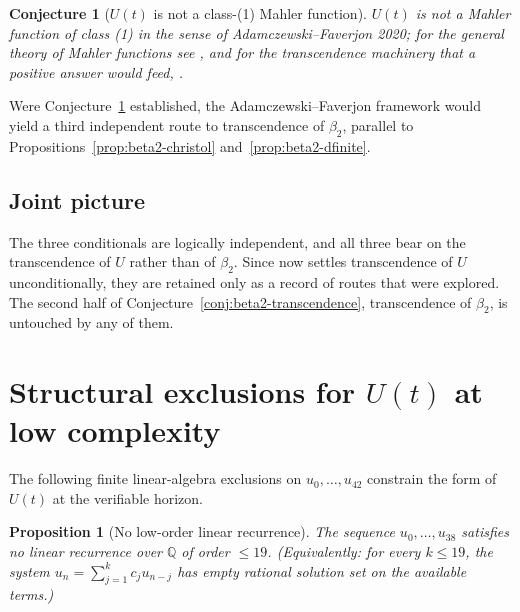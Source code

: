 \documentclass[11pt,a4paper]{article}
\newtheorem{conjecture}{Conjecture}
\newtheorem{proposition}{Proposition}
\theoremstyle{remark}
\theoremstyle{plain}
\begin{document}
\begin{conjecture}[$U(t)$ is not a class-(1) Mahler function]
\label{conj:not-class1-mahler}
$U(t)$ is not a Mahler function of class (1) in the sense of
Adamczewski--Faverjon 2020; for the general theory of Mahler functions
see \cite{Mahler1929,Nishioka}, and for the transcendence machinery that
a positive answer would feed, \cite{Nesterenko1996}.
\end{conjecture}

Were Conjecture~\ref{conj:not-class1-mahler} established, the Adamczewski--Faverjon
framework would yield a third independent route to transcendence of
$\beta_2$, parallel to Propositions~\ref{prop:beta2-christol} and~\ref{prop:beta2-dfinite}.

\subsection{Joint picture}

The three conditionals are logically independent, and all three bear on
the transcendence of $U$ rather than of $\beta_2$. Since
\cite{Bonfioli2} now settles transcendence of $U$ unconditionally, they
are retained only as a record of routes that were explored. The second
half of Conjecture~\ref{conj:beta2-transcendence}, transcendence of
$\beta_2$, is untouched by any of them.

\section{Structural exclusions for $U(t)$ at low complexity}
\label{sec:structural-negatives}

The following finite linear-algebra exclusions on $u_0, \ldots, u_{42}$
constrain the form of $U(t)$ at the verifiable horizon.

\begin{proposition}[No low-order linear recurrence]
\label{prop:no-recurrence}
The sequence $u_0, \ldots, u_{38}$ satisfies no linear recurrence over
$\mathbb{Q}$ of order $\le 19$.  (Equivalently: for every $k \le 19$,
the system $u_n = \sum_{j=1}^k c_j u_{n-j}$ has empty rational solution
set on the available terms.)
\end{proposition}
\end{document}
